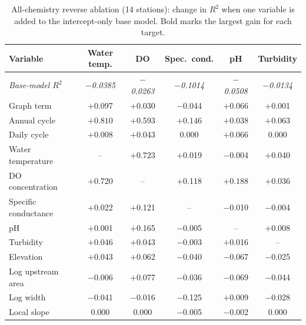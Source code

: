 \documentclass[11pt]{article}
\begin{document}
\begin{table}[h]
\centering
\small
\caption{All-chemistry reverse ablation (14 stations): change in $R^2$ when one variable is added to
the intercept-only base model. Bold marks the largest gain for each target.}
\label{tab:allchemrev}
\begin{tabular}{l c c c c c}
\toprule
Variable & {Water temp.} & {DO} & {Spec.\ cond.} & {pH} & {Turbidity} \\
\midrule
\emph{Base-model $R^2$} & \emph{$-$0.0385} & \emph{$-$0.0263} & \emph{$-$0.1014} & \emph{$-$0.0508} & \emph{$-$0.0134} \\
\midrule
Graph term             & $+$0.097 & $+$0.030 & $-$0.044 & $+$0.066 & $+$0.001 \\
Annual cycle           & $\mathbf{+0.810}$ & $+$0.593 & $\mathbf{+0.146}$ & $+$0.038 & $\mathbf{+0.063}$ \\
Daily cycle            & $+$0.008 & $+$0.043 & 0.000 & $+$0.066 & 0.000 \\
Water temperature      & -- & $\mathbf{+0.723}$ & $+$0.019 & $-$0.004 & $+$0.040 \\
DO concentration       & $+$0.720 & -- & $+$0.118 & $\mathbf{+0.188}$ & $+$0.036 \\
Specific conductance   & $+$0.022 & $+$0.121 & -- & $-$0.010 & $-$0.004 \\
pH                     & $+$0.001 & $+$0.165 & $-$0.005 & -- & $+$0.008 \\
Turbidity              & $+$0.046 & $+$0.043 & $-$0.003 & $+$0.016 & -- \\
Elevation              & $+$0.043 & $+$0.062 & $-$0.040 & $-$0.067 & $-$0.025 \\
Log upstream area      & $-$0.006 & $+$0.077 & $-$0.036 & $-$0.069 & $-$0.044 \\
Log width              & $-$0.041 & $-$0.016 & $-$0.125 & $+$0.009 & $-$0.028 \\
Local slope            & 0.000 & 0.000 & $-$0.005 & $-$0.002 & 0.000 \\
\bottomrule
\end{tabular}
\end{table}
\end{document}

